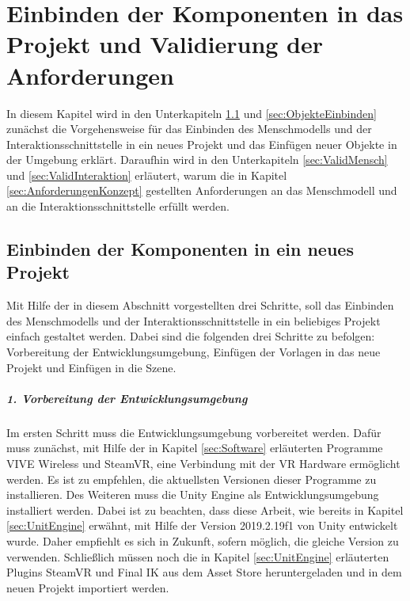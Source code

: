 \chapter{Einbinden der Komponenten in das Projekt und Validierung der Anforderungen}\label{cha:ValidierungDesKonzepts}
In diesem Kapitel wird in den Unterkapiteln \ref{sec:MenschmodellEinbinden} und \ref{sec:ObjekteEinbinden} zunächst die Vorgehensweise für das Einbinden des Menschmodells und der Interaktionsschnittstelle in ein neues Projekt und das Einfügen neuer Objekte in der Umgebung erklärt. Daraufhin wird in den Unterkapiteln \ref{sec:ValidMensch} und \ref{sec:ValidInteraktion} erläutert, warum die in Kapitel \ref{sec:AnforderungenKonzept} gestellten Anforderungen an das Menschmodell und an die Interaktionsschnittstelle erfüllt werden.

\section{Einbinden der Komponenten in ein neues Projekt}\label{sec:MenschmodellEinbinden}
Mit Hilfe der in diesem Abschnitt vorgestellten drei Schritte, soll das Einbinden des Menschmodells und der Interaktionsschnittstelle in ein beliebiges Projekt einfach gestaltet werden. Dabei sind die folgenden drei Schritte zu befolgen: Vorbereitung der Entwicklungsumgebung, Einfügen der Vorlagen in das neue Projekt und Einfügen in die Szene.

\paragraph{1. Vorbereitung der Entwicklungsumgebung}	
\noindent Im ersten Schritt muss die Entwicklungsumgebung vorbereitet werden. Dafür muss zunächst, mit Hilfe der in Kapitel \ref{sec:Software} erläuterten Programme VIVE Wireless und SteamVR, eine Verbindung mit der VR Hardware ermöglicht werden. Es ist zu empfehlen, die aktuellsten Versionen dieser Programme zu installieren. Des Weiteren muss die Unity Engine als Entwicklungsumgebung installiert werden. Dabei ist zu beachten, dass diese Arbeit, wie bereits in Kapitel \ref{sec:UnitEngine} erwähnt, mit Hilfe der Version 2019.2.19f1 von Unity entwickelt wurde. Daher empfiehlt es sich in Zukunft, sofern möglich, die gleiche Version zu verwenden. Schließlich müssen noch die in Kapitel \ref{sec:UnitEngine} erläuterten Plugins SteamVR und Final IK aus dem Asset Store heruntergeladen und in dem neuen Projekt importiert werden.

